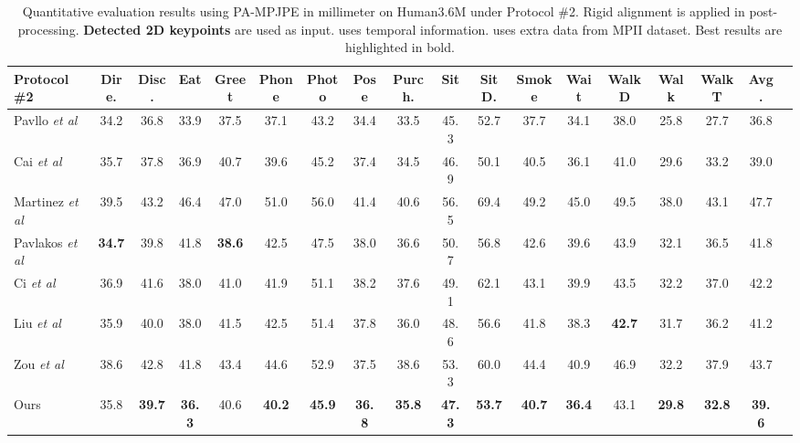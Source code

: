 \documentclass{bmvc2k}
\def\etal{\emph{et al}\bmvaOneDot}
\begin{document}
\begin{table}[!t]
\renewcommand{\baselinestretch}{1.0}
\renewcommand{\arraystretch}{1.0}
\footnotesize
\centering
\setlength{\tabcolsep}{0.5pt}
\setlength{\abovecaptionskip}{-8pt}
\setlength{\belowcaptionskip}{2pt}
\caption{Quantitative evaluation results using PA-MPJPE in millimeter on Human3.6M under Protocol \#2. Rigid alignment is applied in post-processing. \textbf{Detected 2D keypoints} are used as input.  uses temporal information.  uses extra data from MPII dataset. Best results are highlighted in bold.}\label{table:PA-MPJPE}
\begin{tabular}{lccccccccccccccccc}
\hline
\textbf{Protocol \#2    }&Dire.&Disc.&Eat&Greet&Phone&Photo&Pose&Purch.&Sit&SitD.&Smoke&Wait&WalkD&Walk&WalkT&\textbf{Avg.} \\ \hline
Pavllo \etal~\cite{pavllo20193d}&34.2&36.8&33.9&37.5&37.1&43.2&34.4&33.5&45.3&52.7&37.7&34.1&38.0&25.8&27.7&36.8\\ 
Cai \etal~\cite{2019Exploiting} &35.7&37.8&36.9&40.7&39.6&45.2&37.4&34.5&46.9&50.1&40.5&36.1&41.0&29.6&33.2&39.0\\ \hline 
Martinez \etal~\cite{2017simple} &39.5&43.2&46.4&47.0&51.0&56.0&41.4&40.6&56.5&69.4&49.2&45.0&49.5&38.0&43.1&47.7 \\ 
Pavlakos \etal~\cite{2018Ordinal}&{\bf34.7}&39.8&41.8&{\bf38.6}&42.5&47.5&38.0&36.6&50.7&56.8&42.6&39.6&43.9&32.1&36.5&41.8\\  
Ci \etal~\cite{ci2019optimizing}&36.9&41.6&38.0&41.0&41.9&51.1&38.2&37.6&49.1&62.1&43.1&39.9&43.5&32.2&37.0&42.2  \\
Liu \etal~\cite{liu2020comprehensive}  &35.9&40.0&38.0&41.5&42.5&51.4&37.8&36.0&48.6&56.6&41.8&38.3&{\bf42.7}&31.7&36.2&41.2\\
Zou \etal~\cite{zou2020high} &38.6&42.8&41.8&43.4&44.6&52.9&37.5&38.6&53.3&60.0&44.4&40.9&46.9&32.2&37.9&43.7 \\ \hline
Ours&35.8&{\bf 39.7}&{\bf 36.3}&40.6&{\bf 40.2}&{\bf 45.9}&{\bf 36.8} &{\bf 35.8}&{\bf 47.3}&{\bf 53.7}&{\bf 40.7}&{\bf36.4}&43.1&{\bf29.8}&{\bf32.8}&{\bf 39.6}\\ 
\hline
\end{tabular}
\end{table}
\end{document}
